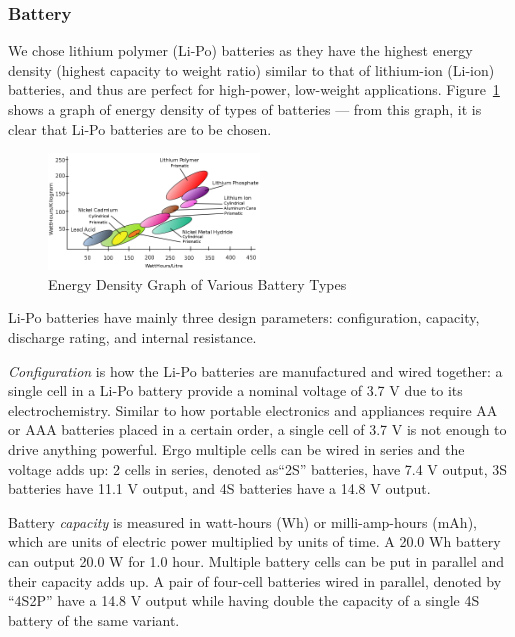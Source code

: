 \subsubsection{Battery}

We chose lithium polymer (Li-Po) batteries as they have the highest energy density (highest capacity to weight ratio) similar to that of lithium-ion (Li-ion) batteries, and thus are perfect for high-power, low-weight applications. Figure~\ref{fig:batterytypes} shows a graph of energy density of types of batteries \cite{battery} --- from this graph, it is clear that Li-Po batteries are to be chosen.

\begin{figure}[h]
    \centering
    \includegraphics[width=0.5\textwidth]{img/energydensity.png}
    \caption{Energy Density Graph of Various Battery Types}
    \label{fig:batterytypes}
\end{figure}

Li-Po batteries have mainly three design parameters: configuration, capacity,  discharge rating, and internal resistance.

\textit{Configuration} is how the Li-Po batteries are manufactured and wired together: a single cell in a Li-Po battery provide a 
nominal voltage of 3.7 V due to its electrochemistry.
Similar to how portable electronics and appliances require AA or AAA batteries placed in a certain order, a single cell of 3.7 V is not enough to drive anything powerful. Ergo multiple cells can be wired in series and the 
voltage adds up: 2 cells in series, denoted as``2S'' batteries, have 7.4 V output, 3S batteries have 11.1 V output, and 4S batteries have a 14.8 V output. 

Battery \textit{capacity} is measured in watt-hours (Wh) or milli-amp-hours (mAh), which are units of electric power multiplied by units of time. A 20.0 Wh battery can output 20.0 W for 1.0 hour. Multiple battery cells can be put in parallel and their capacity adds up. A pair of four-cell batteries wired in parallel, denoted by ``4S2P'' have a 14.8 V output while having double the capacity of a single 4S battery of the same variant.


